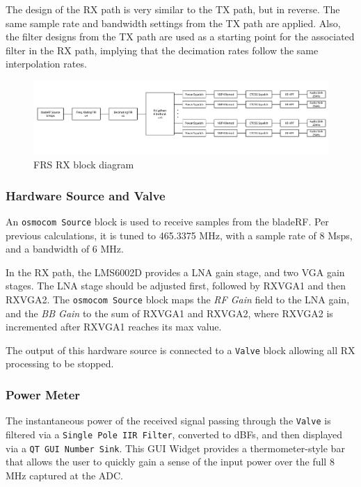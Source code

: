 The design of the \ac{RX} path is very similar to the \ac{TX} path, but in
reverse.  The same sample rate and bandwidth settings from the \ac{TX} path are applied.
Also, the filter designs from the \ac{TX} path are used as a starting point for the
associated filter in the \ac{RX} path, implying that the decimation rates follow
the same interpolation rates.

\begin{figure}[h]
  \centering
  \includegraphics[width=6.5in]{images/frs/bladeRF_FRS_RX_block_diagram.pdf}
  \caption{FRS RX block diagram}
  \label{fig:frs_rx_block_diagram}
\end{figure}

\subsubsection{Hardware Source and Valve}

An \texttt{osmocom Source} block is used to receive samples from the bladeRF.
Per previous calculations, it is tuned to 465.3375 MHz, with a sample rate
of 8 Msps, and a bandwidth of 6 MHz.

In the \ac{RX} path, the LMS6002D provides a \ac{LNA} gain stage, and two
\ac{VGA} gain stages. The \ac{LNA} stage should be adjusted first, followed by
RXVGA1 and then RXVGA2. The \texttt{osmocom Source} block maps the \textit{RF
Gain} field to the \ac{LNA} gain, and the \textit{BB Gain} to the sum of RXVGA1
and RXVGA2, where RXVGA2 is incremented after RXVGA1 reaches its max value.

The output of this hardware source is connected to a \texttt{Valve} block
allowing all \ac{RX} processing to be stopped.

\subsubsection{Power Meter}
The instantaneous power of the received signal passing through the \texttt{Valve} is
filtered via a \texttt{Single Pole IIR Filter}, converted to dBFs, and then
displayed via a \texttt{QT GUI Number Sink}. This \ac{GUI} Widget provides a
thermometer-style bar that allows the user to quickly gain a sense of the input
power over the full 8 MHz captured at the ADC.

